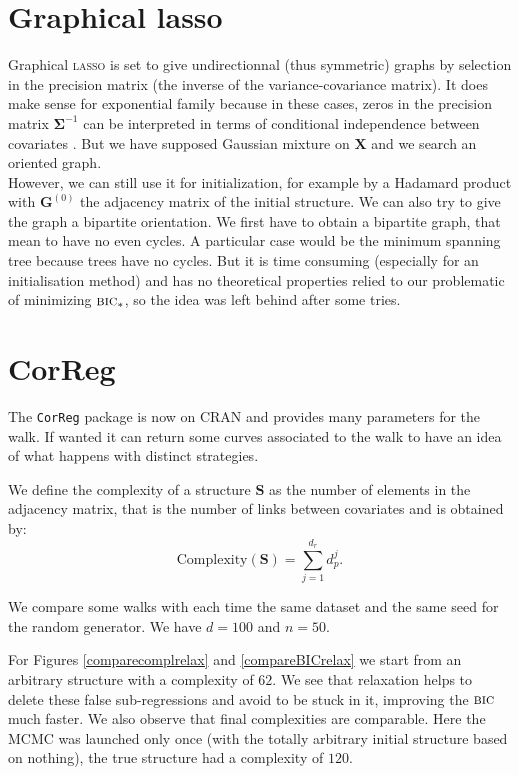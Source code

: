 \documentclass[12pt,a4paper]{report}
\begin{document}
	\section{Graphical { \sc lasso}}\label{sectionGlasso}
		Graphical \textsc{lasso} \cite{friedman2008sparse} \cite{witten2011new} \cite{tibshiranilasso} \cite{friedman2010applications} is set to give undirectionnal (thus symmetric) graphs by selection in the precision matrix (the inverse of the variance-covariance matrix). It does make sense for exponential family because in these cases, zeros in the precision matrix $\boldsymbol{\Sigma}^{-1}$ can be interpreted in terms of conditional independence between covariates \cite{dempster1972covariance}. But we have supposed Gaussian mixture on $\boldsymbol{X}$ and we search an oriented graph.\\
		
	However, we can still use it for initialization, for example by a Hadamard product with $\boldsymbol{G}^{(0)}$ the adjacency matrix of the initial structure. We can also try to give the graph a bipartite orientation. We first have to obtain a bipartite graph, that mean to have no even cycles. A particular case would be the minimum spanning tree \cite{graham1985history,moret1991empirical,gower1969minimum} because trees have no cycles. But it is time consuming (especially for an initialisation method) and has no theoretical properties relied to our problematic of minimizing $\mbox{{\sc bic}}_*$, so the idea was left behind after some tries.		
	
\section{CorReg}	
	The {\tt CorReg} package is now on CRAN and provides many parameters for the walk. If wanted it can return some curves associated to the walk to have an idea of what happens with distinct strategies. 		
	
We define the complexity of a structure $\boldsymbol{S}$ as the number of elements in the adjacency matrix, that is the number of links between covariates and is obtained by:
\begin{equation}
	\textrm{Complexity}(\boldsymbol{S})=\sum_{j=1}^{d_r}d_p^j.
\end{equation}	
	
		We compare some walks with each time the same dataset and the same seed for the random generator. We have $d=100$ and $n=50$.
		
		For Figures \ref{comparecomplrelax} and \ref{compareBICrelax} we start from an arbitrary structure with a complexity of $62$. We see that relaxation helps to delete these false sub-regressions and avoid to be stuck in it, improving the $\mbox{{\sc bic}}$ much faster. We also observe that final complexities are comparable. Here the MCMC was launched only once (with the totally arbitrary initial structure based on nothing), the true structure had a complexity of $120$.
		
\end{document}

